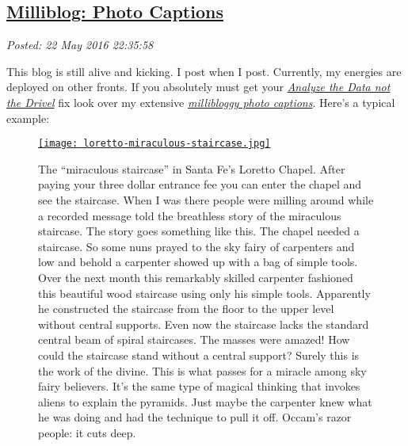 %

\subsection*{\href{https://bakerjd99.wordpress.com/2016/05/22/milliblog-photo-captions/}{Milliblog: Photo Captions}}


\noindent\emph{Posted: 22 May 2016 22:35:58}
\vspace{6pt}

This blog is still alive and kicking. I post when I post. Currently, my
energies are deployed on other fronts. If you absolutely must get your
\emph{\href{https://bakerjd99.wordpress.com/}{Analyze the Data not the
Drivel}} fix look over my extensive
\emph{\href{https://conceptcontrol.smugmug.com/}{millibloggy photo
captions}}. Here's a typical example:

\captionsetup[figure]{labelformat=empty}
\begin{figure}[htbp]
\centering
\href{https://conceptcontrol.smugmug.com/Places/USA-and-Canada/New-Mexico-Montage/i-D79vhKg/A}{\texttt{[image: loretto-miraculous-staircase.jpg]}}
\caption[The ``miraculous staircase'' in Santa Fe's Loretto Chapel.]{The ``miraculous staircase'' in Santa Fe's Loretto Chapel. After paying
your three dollar entrance fee you can enter the chapel and see the
staircase. When I was there people were milling around while a recorded
message told the breathless story of the miraculous staircase. The story
goes something like this. The chapel needed a staircase. So some nuns
prayed to the sky fairy of carpenters and low and behold a carpenter
showed up with a bag of simple tools. Over the next month this
remarkably skilled carpenter fashioned this beautiful wood staircase
using only his simple tools. Apparently he constructed the staircase
from the floor to the upper level without central supports. Even now the
staircase lacks the standard central beam of spiral staircases. The
masses were amazed! How could the staircase stand without a central
support? Surely this is the work of the divine. This is what passes for
a miracle among sky fairy believers. It's the same type of magical
thinking that invokes aliens to explain the pyramids. Just maybe the
carpenter knew what he was doing and had the technique to pull it off.
Occam's razor people: it cuts deep.}
\label{fig:5249X0}
\end{figure}



%